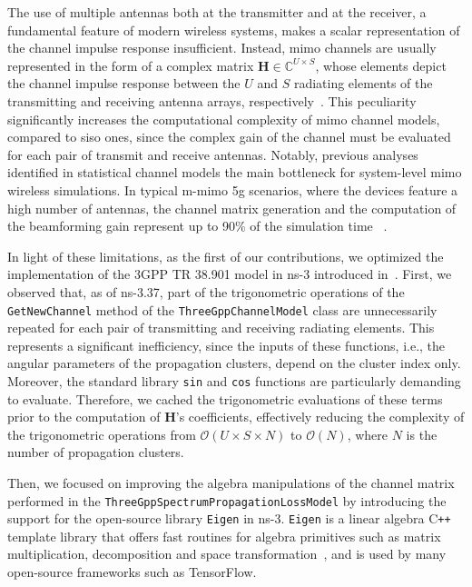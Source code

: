 The use of multiple antennas both at the transmitter and at the receiver, a fundamental feature of modern wireless systems, makes a scalar representation of the channel impulse response insufficient. Instead, \gls{mimo} channels are usually represented in the form of a complex matrix $\bm{H} \in \mathbb{C}^{U \times S}$, whose elements depict the channel impulse response between the $U$ and $S$ radiating elements of the transmitting and receiving antenna arrays, respectively~\cite{TR38901}. This peculiarity significantly increases the computational complexity of \gls{mimo} channel models, compared to \gls{siso} ones, since the complex gain of the channel must be evaluated for each pair of transmit and receive antennas.
Notably, previous analyses identified in statistical channel models the main bottleneck for system-level \gls{mimo} wireless simulations. In typical \gls{m-mimo} \gls{5g} scenarios, where the devices feature a high number of antennas, the channel matrix generation and the computation of the beamforming gain represent up to 90\% of the simulation time ~\cite{testolina2020scalable}. 

In light of these limitations, as the first of our contributions, we optimized the implementation of the 3GPP TR 38.901 model in ns-3 introduced in~\cite{tommaso:20}. 
First, we observed that, as of ns-3.37, part of the trigonometric operations  of the \texttt{GetNewChannel} method of the \texttt{Three\-Gpp\-Channel\-Model} class are unnecessarily repeated for each pair of transmitting and receiving radiating elements. This represents a significant inefficiency, since the inputs of these functions, i.e., the angular parameters of the propagation clusters, depend on the cluster index only. Moreover, the standard library \texttt{sin} and \texttt{cos} functions are particularly demanding to evaluate. Therefore, we cached the trigonometric evaluations of these terms prior to the computation of $\bm{H}$'s coefficients, effectively reducing the complexity of the trigonometric operations from $\mathcal{O}(U \times S \times N)$ to $\mathcal{O}(N)$, where $N$ is the number of propagation clusters. 

Then, we focused on improving the algebra manipulations of the channel matrix performed in the \texttt{Three\-Gpp\-Spectrum\-Propagation\-Loss\-Model} by introducing the support for the open-source library \texttt{Eigen} in ns-3. \texttt{Eigen} is a  linear algebra C\texttt{++} template library that offers fast routines for algebra primitives such as matrix multiplication, decomposition and space transformation~\cite{eigenweb}, and is used by many open-source frameworks such as TensorFlow. 

